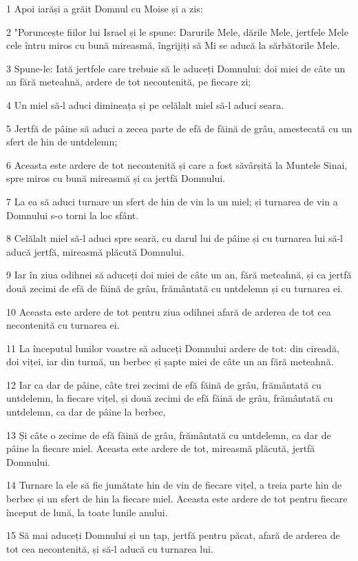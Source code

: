 \par 1 Apoi iarăși a grăit Domnul cu Moise și a zis:
\par 2 "Poruncește fiilor lui Israel și le spune: Darurile Mele, dările Mele, jertfele Mele cele întru miros cu bună mireasmă, îngrijiți să Mi se aducă la sărbătorile Mele.
\par 3 Spune-le: Iată jertfele care trebuie să le aduceți Domnului: doi miei de câte un an fără meteahnă, ardere de tot necontenită, pe fiecare zi;
\par 4 Un miel să-l aduci dimineața și pe celălalt miel să-l aduci seara.
\par 5 Jertfă de pâine să aduci a zecea parte de efă de făină de grâu, amestecată cu un sfert de hin de untdelemn;
\par 6 Aceasta este ardere de tot necontenită și care a fost săvârșită la Muntele Sinai, spre miros cu bună mireasmă și ca jertfă Domnului.
\par 7 La ea să aduci turnare un sfert de hin de vin la un miel; și turnarea de vin a Domnului s-o torni la loc sfânt.
\par 8 Celălalt miel să-l aduci spre seară, cu darul lui de pâine și cu turnarea lui să-l aducă jertfă, mireasmă plăcută Domnului.
\par 9 Iar în ziua odihnei să aduceți doi miei de câte un an, fără meteahnă, și ca jertfă două zecimi de efă de făină de grâu, frământată cu untdelemn și cu turnarea ei.
\par 10 Aceasta este ardere de tot pentru ziua odihnei afară de arderea de tot cea necontenită cu turnarea ei.
\par 11 La începutul lunilor voastre să aduceți Domnului ardere de tot: din cireadă, doi viței, iar din turmă, un berbec și șapte miei de câte un an fără meteahnă.
\par 12 Iar ca dar de pâine, câte trei zecimi de efă făină de grâu, frământată cu untdelemn, la fiecare vițel, și două zecimi de efă făină de grâu, frământată cu untdelemn, ca dar de pâine la berbec,
\par 13 Și câte o zecime de efă făină de grâu, frământată cu untdelemn, ca dar de pâine la fiecare miel. Aceasta este ardere de tot, mireasmă plăcută, jertfă Domnului.
\par 14 Turnare la ele să fie jumătate hin de vin de fiecare vițel, a treia parte hin de berbec și un sfert de hin la fiecare miel. Aceasta este ardere de tot pentru fiecare început de lună, la toate lunile anului.
\par 15 Să mai aduceți Domnului și un țap, jertfă pentru păcat, afară de arderea de tot cea necontenită, și să-l aducă cu turnarea lui.
